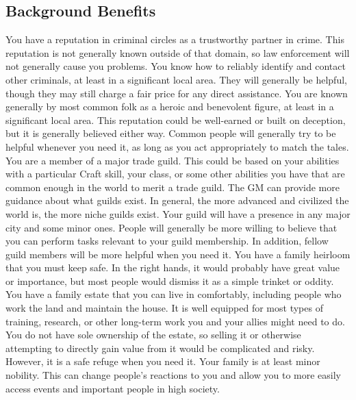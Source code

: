     \subsection{Background Benefits}
         You have a reputation in criminal circles as a trustworthy partner in crime.
        This reputation is not generally known outside of that domain, so law enforcement will not generally cause you problems.
        You know how to reliably identify and contact other criminals, at least in a significant local area.
        They will generally be helpful, though they may still charge a fair price for any direct assistance.
         You are known generally by most common folk as a heroic and benevolent figure, at least in a significant local area.
        This reputation could be well-earned or built on deception, but it is generally believed either way.
        Common people will generally try to be helpful whenever you need it, as long as you act appropriately to match the tales.
         You are a member of a major trade guild.
        This could be based on your abilities with a particular Craft skill, your class, or some other abilities you have that are common enough in the world to merit a trade guild.
        The GM can provide more guidance about what guilds exist.
        In general, the more advanced and civilized the world is, the more niche guilds exist.
        Your guild will have a presence in any major city and some minor ones.
        People will generally be more willing to believe that you can perform tasks relevant to your guild membership.
        In addition, fellow guild members will be more helpful when you need it.
         You have a family heirloom that you must keep safe.
        In the right hands, it would probably have great value or importance, but most people would dismiss it as a simple trinket or oddity.
         You have a family estate that you can live in comfortably, including people who work the land and maintain the house.
        It is well equipped for most types of training, research, or other long-term work you and your allies might need to do.
        You do not have sole ownership of the estate, so selling it or otherwise attempting to directly gain value from it would be complicated and risky.
        However, it is a safe refuge when you need it.
         Your family is at least minor nobility.
        This can change people's reactions to you and allow you to more easily access events and important people in high society.

